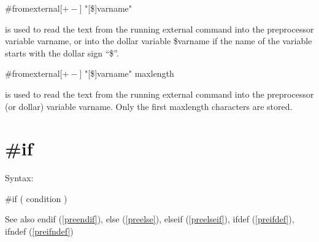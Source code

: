\#fromexternal[$+-$] "[\$]varname"

\noindent is used to read the text from the running external command into 
the preprocessor variable varname, or into the dollar variable \$varname if 
the name of the variable starts with the dollar sign ``\$''.

\#fromexternal[$+-$] "[\$]varname" maxlength

\noindent is used to read the text from the running external command into 
the preprocessor (or dollar) variable varname. Only the first maxlength 
characters are stored.


\section{\#if}
\label{preif}

\noindent Syntax:

\#if ( condition )
 
\noindent See also endif (\ref{preendif}),
            else (\ref{preelse}),
            elseif (\ref{preelseif}),
            ifdef (\ref{preifdef}),
            ifndef (\ref{preifndef})

